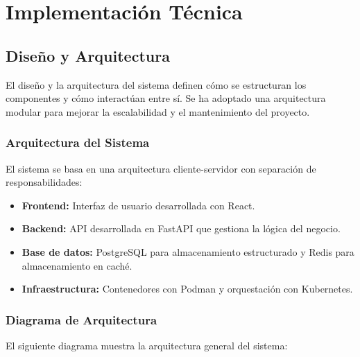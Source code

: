 \chapter{Implementación Técnica}

\section{Diseño y Arquitectura}

El diseño y la arquitectura del sistema definen cómo se estructuran los componentes y cómo interactúan entre sí. Se ha adoptado una arquitectura modular para mejorar la escalabilidad y el mantenimiento del proyecto.

\subsection{Arquitectura del Sistema}
El sistema se basa en una arquitectura cliente-servidor con separación de responsabilidades:

\begin{itemize}
	\item \textbf{Frontend:} Interfaz de usuario desarrollada con React.
	\item \textbf{Backend:} API desarrollada en FastAPI que gestiona la lógica del negocio.
	\item \textbf{Base de datos:} PostgreSQL para almacenamiento estructurado y Redis para almacenamiento en caché.
	\item \textbf{Infraestructura:} Contenedores con Podman y orquestación con Kubernetes.
\end{itemize}

\subsection{Diagrama de Arquitectura}
El siguiente diagrama muestra la arquitectura general del sistema:

\begin{center}
	\begin{otherlanguage}{english} %
	\end{otherlanguage} %
\end{center}



